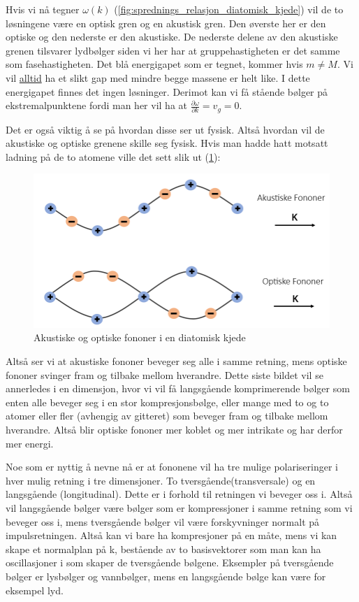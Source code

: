 \documentclass{article}
\begin{document}
Hvis vi nå tegner $\omega(k)$ (\ref{fig:sprednings_relasjon_diatomisk_kjede}) vil de to løsningene være en optisk gren og en akustisk gren. Den øverste her er den optiske og den nederste er den akustiske. De nederste delene av den akustiske grenen tilsvarer lydbølger siden vi her har at gruppehastigheten er det samme som fasehastigheten. Det blå energigapet som er tegnet, kommer hvis $m \ne M$. Vi vil \underline{alltid} ha et slikt gap med mindre begge massene er helt like. I dette energigapet finnes det ingen løsninger. Derimot kan vi få stående bølger på ekstremalpunktene fordi man her vil ha at $\frac{\partial \omega}{\partial k} = v_g = 0$.

Det er også viktig å se på hvordan disse ser ut fysisk. Altså hvordan vil de akustiske og optiske grenene skille seg fysisk. Hvis man hadde hatt motsatt ladning på de to atomene ville det sett slik ut (\ref{fig:akustiske_og_optiske_fononer_diatomisk_kjede}):
\begin{figure}[H]
    \centering
    \includegraphics[width=0.5\linewidth]{bilder/akustiske_og_optiske_fononer_diatomisk_kjede.png}
    \caption{Akustiske og optiske fononer i en diatomisk kjede}
    \label{fig:akustiske_og_optiske_fononer_diatomisk_kjede}
\end{figure}
Altså ser vi at akustiske fononer beveger seg alle i samme retning, mens optiske fononer svinger fram og tilbake mellom hverandre. Dette siste bildet vil se annerledes i en dimensjon, hvor vi vil få langsgående komprimerende bølger som enten alle beveger seg i en stor kompresjonsbølge, eller mange med to og to atomer eller fler (avhengig av gitteret) som beveger fram og tilbake mellom hverandre. Altså blir optiske fononer mer koblet og mer intrikate og har derfor mer energi.

Noe som er nyttig å nevne nå er at fononene vil ha tre mulige polariseringer i hver mulig retning i tre dimensjoner. To tversgående(transversale) og en langsgående (longitudinal). Dette er i forhold til retningen vi beveger oss i. Altså vil langsgående bølger være bølger som er kompressjoner i samme retning som vi beveger oss i, mens tversgående bølger vil være forskyvninger normalt på impulsretningen. Altså kan vi bare ha kompresjoner på en måte, mens vi kan skape et normalplan på k, bestående av to basisvektorer som man kan ha oscillasjoner i som skaper de tversgående bølgene. Eksempler på tversgående bølger er lysbølger og vannbølger, mens en langsgående bølge kan være for eksempel lyd.
\end{document}
